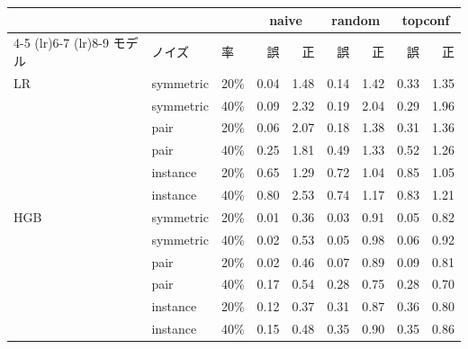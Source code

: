 \begin{tabular}{lllrrrrrr}
\toprule
 & & & \multicolumn{2}{c}{naive} & \multicolumn{2}{c}{random} & \multicolumn{2}{c}{topconf} \\
\cmidrule(lr){4-5} \cmidrule(lr){6-7} \cmidrule(lr){8-9}
モデル & ノイズ & 率 & 誤 & 正 & 誤 & 正 & 誤 & 正 \\
\midrule
LR & symmetric & 20\% & 0.04 & 1.48 & 0.14 & 1.42 & 0.33 & 1.35 \\
 & symmetric & 40\% & 0.09 & 2.32 & 0.19 & 2.04 & 0.29 & 1.96 \\
 & pair & 20\% & 0.06 & 2.07 & 0.18 & 1.38 & 0.31 & 1.36 \\
 & pair & 40\% & 0.25 & 1.81 & 0.49 & 1.33 & 0.52 & 1.26 \\
 & instance & 20\% & 0.65 & 1.29 & 0.72 & 1.04 & 0.85 & 1.05 \\
 & instance & 40\% & 0.80 & 2.53 & 0.74 & 1.17 & 0.83 & 1.21 \\
\addlinespace
HGB & symmetric & 20\% & 0.01 & 0.36 & 0.03 & 0.91 & 0.05 & 0.82 \\
 & symmetric & 40\% & 0.02 & 0.53 & 0.05 & 0.98 & 0.06 & 0.92 \\
 & pair & 20\% & 0.02 & 0.46 & 0.07 & 0.89 & 0.09 & 0.81 \\
 & pair & 40\% & 0.17 & 0.54 & 0.28 & 0.75 & 0.28 & 0.70 \\
 & instance & 20\% & 0.12 & 0.37 & 0.31 & 0.87 & 0.36 & 0.80 \\
 & instance & 40\% & 0.15 & 0.48 & 0.35 & 0.90 & 0.35 & 0.86 \\
\bottomrule
\end{tabular}
